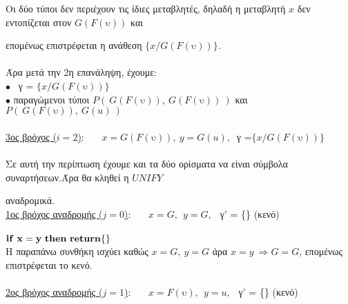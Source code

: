 \documentclass[10pt]{article}
\begin{document}
\hspace{10mm} Οι δύο τύποι δεν περιέχουν τις ίδιες μεταβλητές, δηλαδή η μεταβλητή $x$ δεν εντοπίζεται στον  $G(F(\text{υ}))$ και 

\hspace{10mm} επομένως επιστρέφεται η ανάθεση $\{x/ G(F(\text{υ}))\}$. \\ \\

\hspace{3mm} Άρα μετά την 2η επανάληψη, έχουμε: \\

\hspace{3mm} $\bullet$ \ γ = $\{x/ G(F(\text{υ}))\}$ \\

\hspace{3mm} $\bullet$ παραγώμενοι τύποι $P( \ G(F(\text{υ})), \ G(F(\text{υ})) \ )$ και $P( \ G(F(\text{υ})), \ G(u) \ )$ \\ \\

 \underline{3ος βρόχος ($i = 2$)}: \ \ \  $x = G(F(\text{υ})) ,\ y = G(u), \ $ γ =$\{x/ G(F(\text{υ}))\}$ \\ \\
 
 Σε αυτή την περίπτωση έχουμε και τα δύο ορίσματα να είναι σύμβολα συναρτήσεων.Άρα θα κληθεί η $UNIFY$ 
 
 αναδρομικά. \\

 \hspace{5mm} \underline{1ος βρόχος αναδρομής ($j = 0$)}: \ \ \  $x = G, \ \   y = G, \ \ $ γ' = \{\} (κενό)  \\ \\

 \hspace{10mm}  $\bf if \ x = y \  then \  return \{\}$ \\

\hspace{10mm} Η παραπάνω συνθήκη ισχύει καθώς  $x = G ,\  y = G$ άρα  $x = y \ \Rightarrow 
 G = G$, επομένως επιστρέφεται το κενό. \\ \\

\hspace{5mm} \underline{2ος βρόχος αναδρομής ($j = 1$)}: \ \ \  $x = F(\text{υ}), \ \   y = u, \ \ $ γ' = \{\} (κενό)  \\ \\
\end{document}
